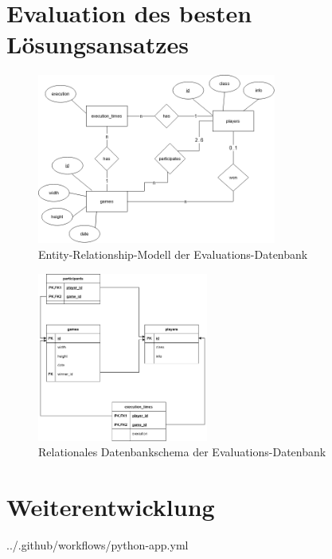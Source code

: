 \section{Evaluation des besten Lösungsansatzes}
\label{sec:anhang-evaluation-loesungsansatz}

\begin{figure}[htb]
	\centering
	\includegraphics[width=0.7\textwidth]{Bilder/er-diagram.png}
	\caption{Entity-Relationship-Modell der Evaluations-Datenbank}
	\label{fig:er-schema}
\end{figure}

\begin{figure}[htb]
	\centering
	\includegraphics[width=0.5\textwidth]{Bilder/relationales_db_schema.png}
	\caption{Relationales Datenbankschema der Evaluations-Datenbank}
	\label{fig:relationales-db-schema}
\end{figure}
\clearpage

\section{Weiterentwicklung}
\label{sec:anhang-weiterentwicklung}

\begin{minipage}{\textwidth}
	
	{../.github/workflows/python-app.yml}
\end{minipage}
\clearpage
